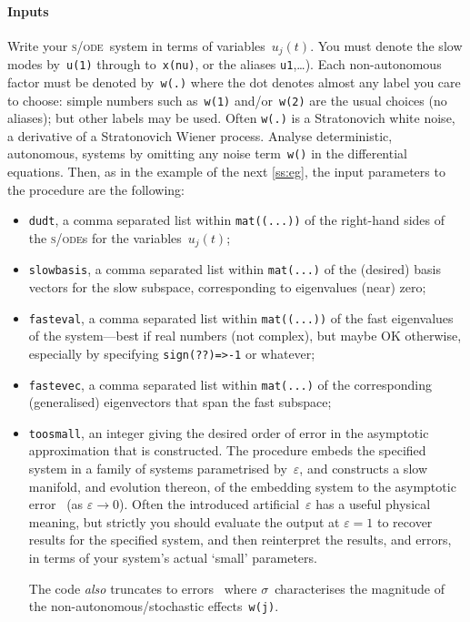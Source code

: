 \documentclass[11pt,a5paper]{article}
\def\eps{\ensuremath{\varepsilon}}
\def\sde{\textsc{s/ode}}
\begin{document}
\paragraph{Inputs}
Write your \sde\ system in terms of variables~\(u_j(t)\). 
You must denote the slow modes by~\verb|u(1)| through
to~\verb|x(nu)|, or the aliases \verb|u1|,\ldots). Each
non-autonomous factor must be denoted by~\verb|w(.)| where
the dot denotes almost any label you care to choose: simple
numbers such as~\verb|w(1)| and/or~\verb|w(2)| are the usual
choices (no aliases); but other labels may be used. Often
\verb|w(.)| is a Stratonovich white noise, a derivative of a
Stratonovich Wiener process. Analyse deterministic,
autonomous, systems by omitting any noise term~\verb|w()| in
the differential equations.  Then, as in the example of the
next \cref{ss:eg}, the input parameters to the procedure are
the following:
\begin{itemize}
\item \verb|dudt|, a comma separated list within
\verb|mat((...))| of the right-hand sides of the \sde{}s for
the variables~\(u_j(t)\);

\item \verb|slowbasis|, a comma separated list within
\verb|mat(...)| of the (desired) basis vectors for the slow
subspace, corresponding to eigenvalues (near) zero;

\item \verb|fasteval|, a comma separated list within
\verb|mat((...))| of the fast eigenvalues of the
system---best if real numbers (not complex), but maybe OK
otherwise, especially by specifying \verb|sign(??)=>-1| or
whatever;

\item \verb|fastevec|, a comma separated list within
\verb|mat(...)| of the corresponding (generalised)
eigenvectors that span the fast subspace;

\item \verb|toosmall|, an integer giving the desired order
of error in the asymptotic approximation that is
constructed.  The procedure embeds the specified system in a
family of systems parametrised by~\(\eps\), and constructs a
slow manifold, and evolution thereon, of the embedding
system to the asymptotic error~\Ord{\eps^{\tt toosmall}} (as
\(\eps\to0\)).  Often the introduced artificial~\(\eps\) has
a useful physical meaning, but strictly you should evaluate
the output at \(\eps=1\) to recover results for the
specified system, and then reinterpret the results, and
errors, in terms of your system's actual `small' parameters.

The code \emph{also} truncates to errors~
where \(\sigma\)~characterises the magnitude of the
non-autonomous\slash stochastic effects~\verb|w(j)|.

\end{itemize}
\end{document}
